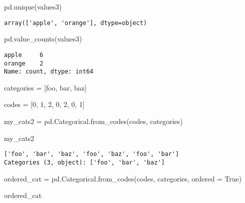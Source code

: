 \documentclass[
  letterpaper,
  DIV=11,
  numbers=noendperiod]{scrreprt}
\newenvironment{Shaded}{\begin{snugshade}}{\end{snugshade}}
\newcommand{\DecValTok}[1]{\textcolor[rgb]{0.68,0.00,0.00}{#1}}
\newcommand{\NormalTok}[1]{\textcolor[rgb]{0.00,0.23,0.31}{#1}}
\newcommand{\OperatorTok}[1]{\textcolor[rgb]{0.37,0.37,0.37}{#1}}
\newcommand{\StringTok}[1]{\textcolor[rgb]{0.13,0.47,0.30}{#1}}
\newcommand{\VariableTok}[1]{\textcolor[rgb]{0.07,0.07,0.07}{#1}}
\begin{document}
\begin{Shaded}
\begin{Highlighting}[]
\NormalTok{pd.unique(values3)}
\end{Highlighting}
\end{Shaded}

\begin{verbatim}
array(['apple', 'orange'], dtype=object)
\end{verbatim}

\begin{Shaded}
\begin{Highlighting}[]
\NormalTok{pd.value\_counts(values3)}
\end{Highlighting}
\end{Shaded}

\begin{verbatim}
apple     6
orange    2
Name: count, dtype: int64
\end{verbatim}

\begin{Shaded}
\begin{Highlighting}[]
\NormalTok{categories }\OperatorTok{=}\NormalTok{ [}\StringTok{\textquotesingle{}foo\textquotesingle{}}\NormalTok{, }\StringTok{\textquotesingle{}bar\textquotesingle{}}\NormalTok{, }\StringTok{\textquotesingle{}baz\textquotesingle{}}\NormalTok{]}

\NormalTok{codes }\OperatorTok{=}\NormalTok{ [}\DecValTok{0}\NormalTok{, }\DecValTok{1}\NormalTok{, }\DecValTok{2}\NormalTok{, }\DecValTok{0}\NormalTok{, }\DecValTok{2}\NormalTok{, }\DecValTok{0}\NormalTok{, }\DecValTok{1}\NormalTok{]}

\NormalTok{my\_cats2 }\OperatorTok{=}\NormalTok{ pd.Categorical.from\_codes(codes, categories)}

\NormalTok{my\_cats2}
\end{Highlighting}
\end{Shaded}

\begin{verbatim}
['foo', 'bar', 'baz', 'foo', 'baz', 'foo', 'bar']
Categories (3, object): ['foo', 'bar', 'baz']
\end{verbatim}

\begin{Shaded}
\begin{Highlighting}[]
\NormalTok{ordered\_cat }\OperatorTok{=}\NormalTok{ pd.Categorical.from\_codes(codes, categories, }
\NormalTok{                                 ordered }\OperatorTok{=} \VariableTok{True}\NormalTok{)}

\NormalTok{ordered\_cat}
\end{Highlighting}
\end{Shaded}
\end{document}
